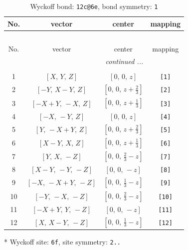 \documentclass[fleqn,8pt]{jsarticle}
\begin{document}
\begin{longtable}{cccc}
\caption{Wyckoff bond: {\tt 12c@6e}, bond symmetry: {\tt 1}}
 \\
 \hline \hline
No. & vector & center & mapping \\ \hline \endfirsthead

\multicolumn{3}{l}{\tablename\ \thetable{}} \\
 \hline \hline
No. & vector & center & mapping \\ \hline \endhead

 \hline \hline
\multicolumn{3}{r}{\footnotesize\it continued ...} \\ \endfoot

 \hline \hline
\multicolumn{3}{r}{} \\ \endlastfoot

1 & $\left[ X,\, Y,\, Z \right]$ & $\left[ 0,\, 0,\, z \right]$ & {\tt [1]} \\ \hline
2 & $\left[ - Y,\, X - Y,\, Z \right]$ & $\left[ 0,\, 0,\, z + \frac{2}{3} \right]$ & {\tt [2]} \\ \hline
3 & $\left[ - X + Y,\, - X,\, Z \right]$ & $\left[ 0,\, 0,\, z + \frac{1}{3} \right]$ & {\tt [3]} \\ \hline
4 & $\left[ - X,\, - Y,\, Z \right]$ & $\left[ 0,\, 0,\, z \right]$ & {\tt [4]} \\ \hline
5 & $\left[ Y,\, - X + Y,\, Z \right]$ & $\left[ 0,\, 0,\, z + \frac{2}{3} \right]$ & {\tt [5]} \\ \hline
6 & $\left[ X - Y,\, X,\, Z \right]$ & $\left[ 0,\, 0,\, z + \frac{1}{3} \right]$ & {\tt [6]} \\ \hline
7 & $\left[ Y,\, X,\, - Z \right]$ & $\left[ 0,\, 0,\, \frac{2}{3} - z \right]$ & {\tt [7]} \\ \hline
8 & $\left[ X - Y,\, - Y,\, - Z \right]$ & $\left[ 0,\, 0,\, - z \right]$ & {\tt [8]} \\ \hline
9 & $\left[ - X,\, - X + Y,\, - Z \right]$ & $\left[ 0,\, 0,\, \frac{1}{3} - z \right]$ & {\tt [9]} \\ \hline
10 & $\left[ - Y,\, - X,\, - Z \right]$ & $\left[ 0,\, 0,\, \frac{2}{3} - z \right]$ & {\tt [10]} \\ \hline
11 & $\left[ - X + Y,\, Y,\, - Z \right]$ & $\left[ 0,\, 0,\, - z \right]$ & {\tt [11]} \\ \hline
12 & $\left[ X,\, X - Y,\, - Z \right]$ & $\left[ 0,\, 0,\, \frac{1}{3} - z \right]$ & {\tt [12]} \\
\end{longtable}
* Wyckoff site: {\tt 6f}, site symmetry: {\tt 2..}
\end{document}

